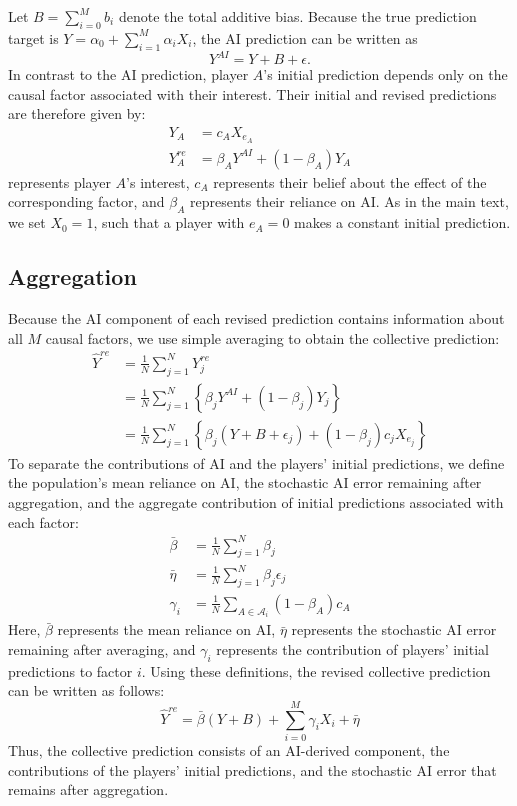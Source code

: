 \documentclass[12pt]{article}
\begin{document}
Let $B=\sum_{i=0}^{M}b_i$ denote the total additive bias. 
Because the true prediction target is $Y=\alpha_0+\sum_{i=1}^{M}\alpha_iX_i$, the AI prediction can be written as
\begin{equation}
Y^{AI} = Y + B + \epsilon.
\end{equation}
In contrast to the AI prediction, player $A$'s initial prediction depends only on the causal factor associated with their interest. 
Their initial and revised predictions are therefore given by:
\begin{align}
Y_A &= c_A X_{e_A}\\
Y_A^{re} &= \beta_A Y^{AI} + (1-\beta_A)Y_A
\end{align}
represents player $A$'s interest, $c_A$ represents their belief about the effect of the corresponding factor, and $\beta_A$ represents their reliance on AI.
As in the main text, we set $X_0=1$, such that a player with $e_A=0$ makes a constant initial prediction.

\subsection*{Aggregation}

Because the AI component of each revised prediction contains information about all $M$ causal factors, we use simple averaging to obtain the collective prediction:
\begin{align}
\hat{Y}^{re}
&= \frac{1}{N}\sum_{j = 1}^N Y_j^{re}\\
&= \frac{1}{N}\sum_{j = 1}^N\left\{\beta_jY^{AI} + (1-\beta_j)Y_j\right\}\\
&= \frac{1}{N}\sum_{j = 1}^N\left\{\beta_j(Y + B + \epsilon_j) + (1 - \beta_j)c_jX_{e_j}\right\}
\end{align}
To separate the contributions of AI and the players' initial predictions, we define the population's mean reliance on AI, the stochastic AI error remaining after aggregation, and the aggregate contribution of initial predictions associated with each factor:
\begin{align}
\bar{\beta} &= \frac{1}{N}\sum_{j = 1}^{N} \beta_j\\
\bar{\eta} &= \frac{1}{N}\sum_{j = 1}^{N} \beta_j\epsilon_j\\
\label{eta}
\gamma_i &= \frac{1}{N}\sum_{A \in \mathcal{A}_i}(1-\beta_A)c_A
\end{align}
Here, $\bar{\beta}$ represents the mean reliance on AI, $\bar{\eta}$ represents the stochastic AI error remaining after averaging, and $\gamma_i$ represents the contribution of players' initial predictions to factor $i$. 
Using these definitions, the revised collective prediction can be written as follows:
\begin{equation}
\hat{Y}^{re} = \bar{\beta}(Y + B) + \sum_{i = 0}^{M}\gamma_iX_i + \bar{\eta}
\end{equation}
Thus, the collective prediction consists of an AI-derived component, the contributions of the players' initial predictions, and the stochastic AI error that remains after aggregation.
\end{document}
